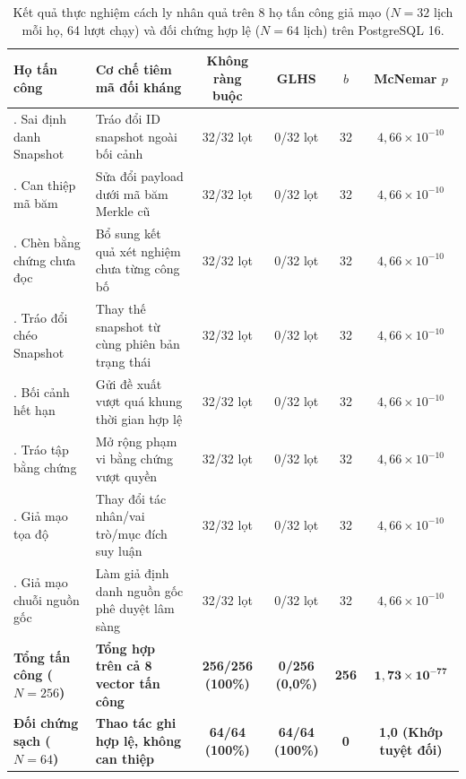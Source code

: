 \documentclass[11pt]{article}
\begin{document}
\begin{table}[H]
\centering
\scriptsize
\caption{Kết quả thực nghiệm cách ly nhân quả trên 8 họ tấn công giả mạo ($N=32$ lịch mỗi họ, 64 lượt chạy) và đối chứng hợp lệ ($N=64$ lịch) trên PostgreSQL 16.}
\label{tab:ablation_breakdown_vi}
\begin{tabularx}{\textwidth}{>{\raggedright\arraybackslash}p{} X c c c c}
\toprule
\textbf{Họ tấn công} & \textbf{Cơ chế tiêm mã đối kháng} & \textbf{Không ràng buộc} & \textbf{GLHS} & \textbf{$b$} & \textbf{McNemar $p$}\\
\midrule
1. Sai định danh Snapshot & Tráo đổi ID snapshot ngoài bối cảnh & 32/32 lọt & 0/32 lọt & 32 & $4{,}66 \times 10^{-10}$\\
2. Can thiệp mã băm & Sửa đổi payload dưới mã băm Merkle cũ & 32/32 lọt & 0/32 lọt & 32 & $4{,}66 \times 10^{-10}$\\
3. Chèn bằng chứng chưa đọc & Bổ sung kết quả xét nghiệm chưa từng công bố & 32/32 lọt & 0/32 lọt & 32 & $4{,}66 \times 10^{-10}$\\
4. Tráo đổi chéo Snapshot & Thay thế snapshot từ cùng phiên bản trạng thái & 32/32 lọt & 0/32 lọt & 32 & $4{,}66 \times 10^{-10}$\\
5. Bối cảnh hết hạn & Gửi đề xuất vượt quá khung thời gian hợp lệ & 32/32 lọt & 0/32 lọt & 32 & $4{,}66 \times 10^{-10}$\\
6. Tráo tập bằng chứng & Mở rộng phạm vi bằng chứng vượt quyền & 32/32 lọt & 0/32 lọt & 32 & $4{,}66 \times 10^{-10}$\\
7. Giả mạo tọa độ & Thay đổi tác nhân/vai trò/mục đích suy luận & 32/32 lọt & 0/32 lọt & 32 & $4{,}66 \times 10^{-10}$\\
8. Giả mạo chuỗi nguồn gốc & Làm giả định danh nguồn gốc phê duyệt lâm sàng & 32/32 lọt & 0/32 lọt & 32 & $4{,}66 \times 10^{-10}$\\
\midrule
\textbf{Tổng tấn công ($N=256$)} & \textbf{Tổng hợp trên cả 8 vector tấn công} & \textbf{256/256 (100\%)} & \textbf{0/256 (0,0\%)} & \textbf{256} & $\mathbf{1{,}73 \times 10^{-77}}$\\
\textbf{Đối chứng sạch ($N=64$)} & \textbf{Thao tác ghi hợp lệ, không can thiệp} & \textbf{64/64 (100\%)} & \textbf{64/64 (100\%)} & \textbf{0} & \textbf{1,0 (Khớp tuyệt đối)}\\
\bottomrule
\end{tabularx}
\end{table}
\end{document}
